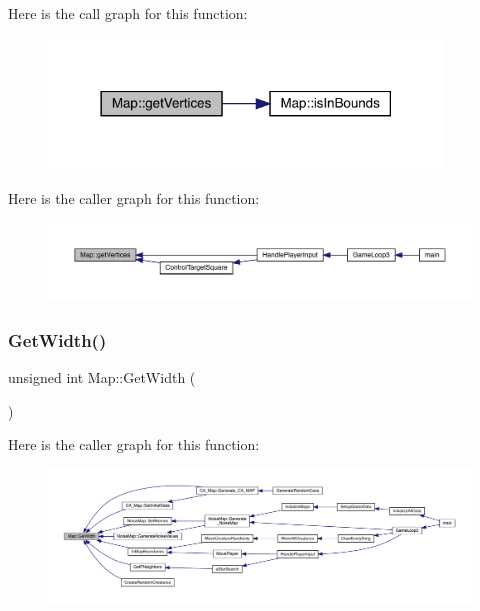 Here is the call graph for this function\+:
\nopagebreak
\begin{figure}[H]
\begin{center}
\leavevmode
\includegraphics[width=297pt]{dd/d11/class_map_ace55cfcebed9b27fd2329a16ce4ab352_cgraph}
\end{center}
\end{figure}
Here is the caller graph for this function\+:
\nopagebreak
\begin{figure}[H]
\begin{center}
\leavevmode
\includegraphics[width=350pt]{dd/d11/class_map_ace55cfcebed9b27fd2329a16ce4ab352_icgraph}
\end{center}
\end{figure}
\mbox{\label{class_map_a1e9263abe2e1290fc383586c327f9f4a}} 
\subsubsection{\texorpdfstring{Get\+Width()}{GetWidth()}}
{\footnotesize\ttfamily unsigned int Map\+::\+Get\+Width (\begin{DoxyParamCaption}{ }\end{DoxyParamCaption})}

Here is the caller graph for this function\+:
\nopagebreak
\begin{figure}[H]
\begin{center}
\leavevmode
\includegraphics[width=350pt]{dd/d11/class_map_a1e9263abe2e1290fc383586c327f9f4a_icgraph}
\end{center}
\end{figure}
\mbox{\label{class_map_af2b4481fa4588c8aa5ab6e8c45c5f7cf}} 
